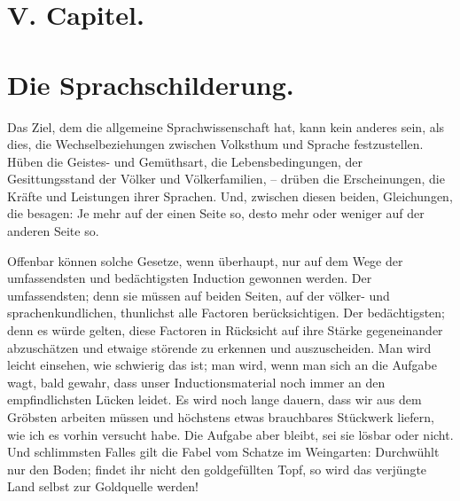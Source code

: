 \begin{styleAnmerk}
\end{styleAnmerk}


\section*{V. Capitel.}\label{IV.V}
\section*{Die Sprachschilderung.}

Das Ziel, dem die allgemeine Sprachwissenschaft  hat, kann kein anderes sein, als dies, die Wechselbeziehungen zwischen Volksthum und Sprache festzustellen. Hüben die Geistes- und Gemüthsart, die Lebensbedingungen, der Gesittungsstand der Völker und Völkerfamilien, – drüben die Erscheinungen, die Kräfte und Leistungen ihrer Sprachen. Und, zwischen diesen beiden, Gleichungen, die besagen: Je mehr auf der einen Seite so, desto mehr oder weniger auf der anderen Seite so.

\label{sp.477}

Offenbar können solche Gesetze, wenn überhaupt, nur auf dem Wege der umfassendsten und bedächtigsten Induction gewonnen werden. Der umfassendsten; denn sie müssen auf beiden Seiten, auf der völker- und sprachenkundlichen, thunlichst alle Factoren berücksichtigen. Der bedächtigsten; denn es würde gelten, diese Factoren in Rücksicht auf ihre Stärke gegeneinander abzuschätzen und etwaige störende zu erkennen und auszuscheiden. Man wird leicht einsehen, wie schwierig das ist; man wird, wenn man sich an die Aufgabe wagt, bald gewahr, dass unser Inductionsmaterial noch immer an den empfindlichsten Lücken leidet. Es wird noch lange dauern, dass wir aus dem Gröbsten arbeiten müssen und höchstens etwas brauchbares Stückwerk liefern, wie ich es vorhin versucht habe. Die Aufgabe aber bleibt, sei sie lösbar oder nicht. Und schlimmsten Falles gilt die Fabel vom Schatze im Weingarten: Durchwühlt nur den Boden; findet ihr nicht den goldgefüllten Topf, so wird das verjüngte Land selbst zur Goldquelle werden!

